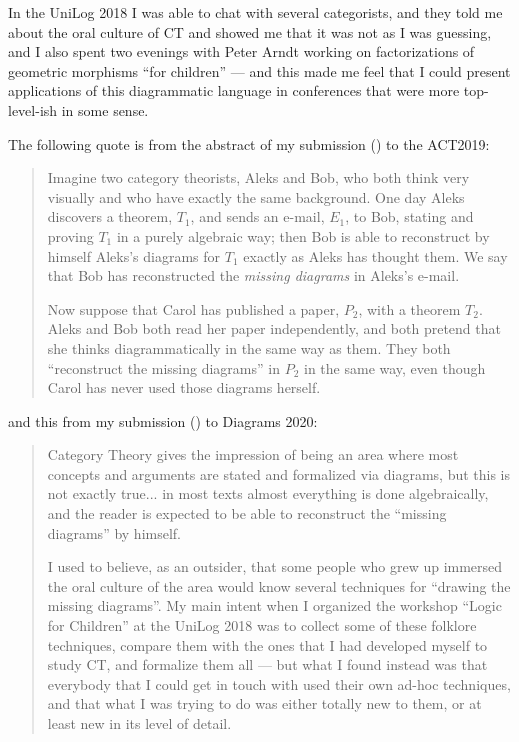\documentclass[oneside,12pt]{article}
\begin{document}
In the UniLog 2018 I was able to chat with several categorists, and
they told me about the oral culture of CT and showed me that it was
not as I was guessing, and I also spent two evenings with Peter Arndt
working on factorizations of geometric morphisms ``for children'' ---
and this made me feel that I could present applications of this
diagrammatic language in conferences that were more top-level-ish in
some sense.

The following quote is from the abstract of my submission (\cite{MDE})
to the ACT2019:
%
\begin{quotation}

  Imagine two category theorists, Aleks and Bob, who both think very
  visually and who have exactly the same background. One day Aleks
  discovers a theorem, $T_1$, and sends an e-mail, $E_1$, to Bob,
  stating and proving $T_1$ in a purely algebraic way; then Bob is
  able to reconstruct by himself Aleks's diagrams for $T_1$ exactly as
  Aleks has thought them. We say that Bob has reconstructed the
  {\it missing diagrams} in Aleks's e-mail.

  Now suppose that Carol has published a paper, $P_2$, with a theorem
  $T_2$. Aleks and Bob both read her paper independently, and both
  pretend that she thinks diagrammatically in the same way as them.
  They both ``reconstruct the missing diagrams'' in $P_2$ in the same
  way, even though Carol has never used those diagrams herself.

\end{quotation}
%
and this from my submission (\cite{OchsTallinnAbs}) to Diagrams 2020:
%
\begin{quotation}

  Category Theory gives the impression of being an area where most
  concepts and arguments are stated and formalized via diagrams, but
  this is not exactly true... in most texts almost everything is done
  algebraically, and the reader is expected to be able to reconstruct
  the ``missing diagrams'' by himself.

  I used to believe, as an outsider, that some people who grew up
  immersed the oral culture of the area would know several techniques
  for ``drawing the missing diagrams''. My main intent when I
  organized the workshop ``Logic for Children'' at the UniLog 2018
  \cite{OchsLucatelli} was to collect some of these folklore
  techniques, compare them with the ones that I had developed myself
  to study CT, and formalize them all --- but what I found instead was
  that everybody that I could get in touch with used their own ad-hoc
  techniques, and that what I was trying to do was either totally new
  to them, or at least new in its level of detail.

\end{quotation}
\end{document}
